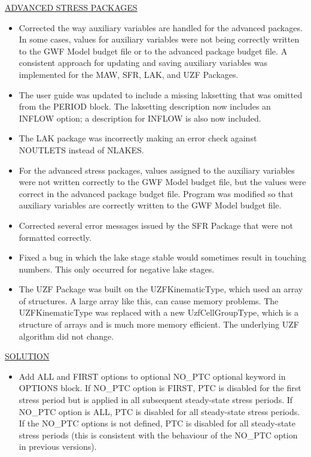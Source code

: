 \documentclass[11pt,twoside,twocolumn]{usgsreport}
\begin{document}
\begin{itemize}
\underline{ADVANCED STRESS PACKAGES}
\begin{itemize}
\item Corrected the way auxiliary variables are handled for the advanced packages.  In some cases, values for auxiliary variables were not being correctly written to the GWF Model budget file or to the advanced package budget file.  A consistent approach for updating and saving auxiliary variables was implemented for the MAW, SFR, LAK, and UZF Packages.
\item The user guide was updated to include a missing laksetting that was omitted from the PERIOD block.  The laksetting description now includes an INFLOW option; a description for INFLOW is also now included.
\item The LAK package was incorrectly making an error check against NOUTLETS instead of NLAKES.
\item For the advanced stress packages, values assigned to the auxiliary variables were not written correctly to the GWF Model budget file, but the values were correct in the advanced package budget file.  Program was modified so that auxiliary variables are correctly written to the GWF Model budget file.
\item Corrected several error messages issued by the SFR Package that were not formatted correctly.  
\item Fixed a bug in which the lake stage stable would sometimes result in touching numbers.  This only occurred for negative lake stages.
\item The UZF Package was built on the UZFKinematicType, which used an array of structures.  A large array like this, can cause memory problems.  The UZFKinematicType was replaced with a new UzfCellGroupType, which is a structure of arrays and is much more memory efficient.  The underlying UZF algorithm did not change.
\end{itemize}

\underline{SOLUTION}
\begin{itemize}
\item Add ALL and FIRST options to optional NO\_PTC optional keyword in OPTIONS block. If NO\_PTC option is FIRST, PTC is disabled for the first stress period but is applied in all subsequent steady-state stress periods. If NO\_PTC option is ALL, PTC is disabled for all steady-state stress periods. If the NO\_PTC options is not defined, PTC is disabled for all steady-state stress periods (this is consistent with the behaviour of the NO\_PTC option in previous versions).
\end{itemize}


\end{itemize}
\end{document}
